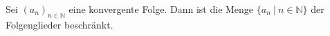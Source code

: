 Sei $(a_n)_{n \in \mathbb{N}}$ eine konvergente Folge. Dann ist die Menge $\{a_n \ | \ n \in \mathbb{N}\}$ der Folgenglieder beschränkt.